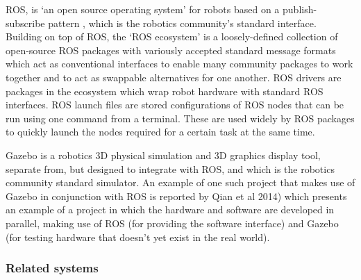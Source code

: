 \documentclass[a4paper]{article}
\begin{document}
ROS, is `an open source operating system' for robots based on a publish-subscribe pattern \cite{quigley2009ros}, which is the robotics community’s standard interface. Building on top of ROS, the `ROS ecosystem’ is a loosely-defined collection of open-source ROS packages with variously accepted standard message formats which act as conventional interfaces to enable many community packages to work together and to act as swappable alternatives for one another. ROS drivers are packages in the ecosystem which wrap robot hardware with standard ROS interfaces. ROS launch files are stored configurations of ROS nodes that can be run using one command from a terminal. These are used widely by ROS packages to quickly launch the nodes required for a certain task at the same time.

Gazebo \cite{koenig2004design} is a robotics 3D physical simulation and 3D graphics display tool, separate from, but designed to integrate with ROS, and which is the robotics community standard simulator. An example of one such project that makes use of Gazebo in conjunction with ROS is reported by Qian et al 2014) which presents an example of a project in which the hardware and software are developed in parallel, making use of ROS (for providing the software interface) and Gazebo (for testing hardware that doesn’t yet exist in the real world). 


\subsubsection{Related systems}
\end{document}
